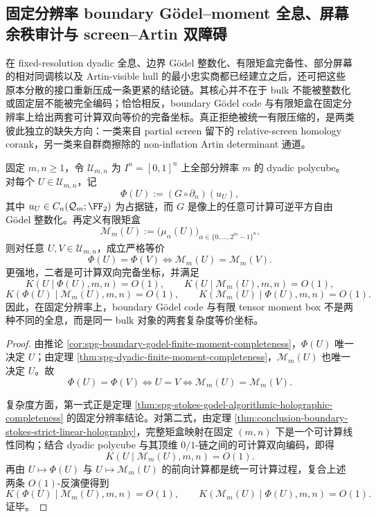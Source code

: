 \subsection{固定分辨率 boundary Gödel--moment 全息、屏幕余秩审计与 screen--Artin 双障碍}\label{subsec:conclusion-fixedresolution-screen-artin-dual-obstruction}

在 fixed-resolution dyadic 全息、边界 Gödel 整数化、有限矩盒完备性、部分屏幕的相对同调核以及 Artin-visible hull 的最小忠实商都已经建立之后，还可把这些原本分散的接口重新压成一条更紧的结论链。其核心并不在于 bulk 不能被整数化或固定层不能被完全编码；恰恰相反，boundary Gödel code 与有限矩盒在固定分辨率上给出两套可计算双向等价的完备坐标。真正拒绝被统一有限压缩的，是两类彼此独立的缺失方向：一类来自 partial screen 留下的 relative-screen homology corank，另一类来自群商擦除的 non-inflation Artin determinant 通道。

\begin{theorem}\label{thm:conclusion-fixedresolution-boundary-godel-momentbox-equivalence}
固定 \(m,n\ge 1\)，令 \(\mathcal U_{m,n}\) 为 \(I^n=[0,1]^n\) 上全部分辨率 \(m\) 的 dyadic polycube。对每个 \(U\in\mathcal U_{m,n}\)，记
\[
\Phi(U):=(G\circ \partial_n)(u_U),
\]
其中 \(u_U\in C_n(\mathcal Q_m;\FF_2)\) 为占据链，而 \(G\) 是像上的任意可计算可逆平方自由 Gödel 整数化。再定义有限矩盒
\[
\mathcal M_m(U):=
\bigl(\mu_\alpha(U)\bigr)_{\alpha\in\{0,\dots,2^m-1\}^n}.
\]
则对任意 \(U,V\in\mathcal U_{m,n}\)，成立严格等价
\[
\Phi(U)=\Phi(V)
\iff
\mathcal M_m(U)=\mathcal M_m(V).
\]
更强地，二者是可计算双向完备坐标，并满足
\[
K(U\mid \Phi(U),m,n)=O(1),
\qquad
K(U\mid \mathcal M_m(U),m,n)=O(1),
\]
\[
K(\Phi(U)\mid \mathcal M_m(U),m,n)=O(1),
\qquad
K(\mathcal M_m(U)\mid \Phi(U),m,n)=O(1).
\]
因此，在固定分辨率上，boundary Gödel code 与有限 tensor moment box 不是两种不同的全息，而是同一 bulk 对象的两套复杂度等价坐标。
\end{theorem}

\begin{proof}
由推论 \ref{cor:spg-boundary-godel-finite-moment-completeness}，\(\Phi(U)\) 唯一决定 \(U\)；由定理 \ref{thm:spg-dyadic-finite-moment-completeness}，\(\mathcal M_m(U)\) 也唯一决定 \(U\)。故
\[
\Phi(U)=\Phi(V)
\iff
U=V
\iff
\mathcal M_m(U)=\mathcal M_m(V).
\]

复杂度方面，第一式正是定理 \ref{thm:spg-stokes-godel-algorithmic-holographic-completeness} 的固定分辨率结论。对第二式，由定理 \ref{thm:conclusion-boundary-stokes-strict-linear-holography}，完整矩盒映射在固定 \((m,n)\) 下是一个可计算线性同构；结合 dyadic polycube 与其顶维 \(0/1\)-链之间的可计算双向编码，即得
\[
K(U\mid \mathcal M_m(U),m,n)=O(1).
\]
再由 \(U\mapsto \Phi(U)\) 与 \(U\mapsto \mathcal M_m(U)\) 的前向计算都是统一可计算过程，复合上述两条 \(O(1)\)-反演便得到
\[
K(\Phi(U)\mid \mathcal M_m(U),m,n)=O(1),
\qquad
K(\mathcal M_m(U)\mid \Phi(U),m,n)=O(1).
\]
证毕。
\end{proof}

